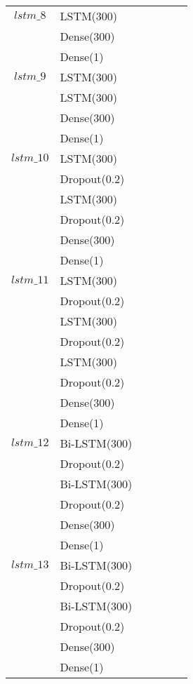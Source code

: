 \begin{longtable}{| c | m{0.58\linewidth} | r | m{0.1\linewidth} |}

    $lstm\_8$   & LSTM(300)                 \\
                & Dense(300)                 \\
                & Dense(1)                  \\ \hline

    $lstm\_9$   & LSTM(300)                 \\
                & LSTM(300)                 \\
                & Dense(300)                \\
                & Dense(1)                  \\ \hline

    $lstm\_10$  & LSTM(300)                 \\
                & Dropout(0.2)              \\
                & LSTM(300)                 \\
                & Dropout(0.2)              \\
                & Dense(300)                \\
                & Dense(1)                  \\ \hline
    $lstm\_11$  & LSTM(300)                 \\
                & Dropout(0.2)              \\
                & LSTM(300)                 \\
                & Dropout(0.2)              \\
                & LSTM(300)                 \\
                & Dropout(0.2)              \\
                & Dense(300)                \\
                & Dense(1)                  \\ \hline
    $lstm\_12$  & Bi-LSTM(300)              \\
                & Dropout(0.2)              \\
                & Bi-LSTM(300)              \\
                & Dropout(0.2)              \\
                & Dense(300)                \\
                & Dense(1)                  \\ \hline
    $lstm\_13$  & Bi-LSTM(300)              \\
                & Dropout(0.2)              \\
                & Bi-LSTM(300)              \\
                & Dropout(0.2)              \\
                & Dense(300)                \\
                & Dense(1)                  \\ \hline


\end{longtable}
